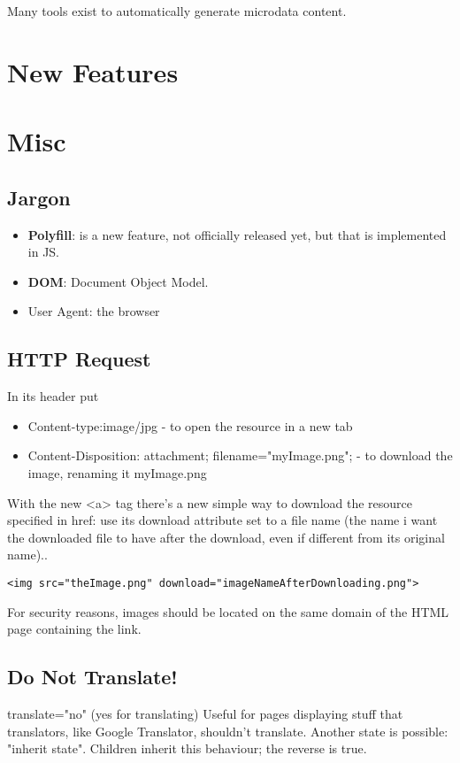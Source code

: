 \documentclass[a4paper,11pt]{book}
\begin{document}
    Many tools exist to automatically generate microdata content.

\chapter{New Features}

\chapter{Misc}
    \section{Jargon}
    \begin{itemize}
        \item \textbf{Polyfill}: is a new feature, not officially released yet, but that is implemented in JS.
        \item \textbf{DOM}: Document Object Model.
        \item User Agent: the browser
    \end{itemize}
    \section{HTTP Request}
    In its header put
    \begin{itemize}
        \item Content-type:image/jpg - to open the resource in a new tab
        \item Content-Disposition: attachment; filename="myImage.png"; - to download the image, renaming it myImage.png
    \end{itemize}
    With the new <a> tag there's a new simple way to download the resource specified in href: use its download attribute
    set to a file name (the name i want the downloaded file to have after the download, even if different from its original name)..
    \begin{verbatim}<img src="theImage.png" download="imageNameAfterDownloading.png">\end{verbatim}
    For security reasons, images should be located on the same domain of the HTML page containing the link.
    \section{Do Not Translate!}
    translate="no" (yes for translating)
    Useful for pages displaying stuff that translators, like Google Translator, shouldn't translate.
    Another state is possible: "inherit state".
    Children inherit this behaviour; the reverse is true.
\end{document}

